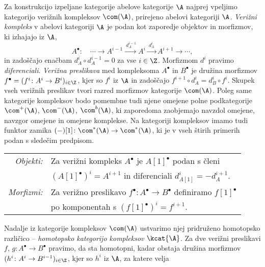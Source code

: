 Za konstrukcijo izpeljane kategorije abelove kategorije $\A$ najprej vpeljimo kategorijo verižnih kompleksov $\com(\A)$, prirejeno abelovi kategoriji $\A$.
\emph{Verižni kompleks} v abelovi kategoriji $\A$ je podan kot zaporedje objektov in morfizmov, ki izhajajo iz $\A$,
\[
    A^\bullet : \quad \cdots \to A^{i-1} \xrightarrow{\ d_A^{i-1}} A^i \xrightarrow{\ d_A^{i} \ } A^{i+1} \to \cdots,
\] 
in zadoščajo enačbam $d_A^{i} \circ d_A^{i-1} = 0$ za vse $i \in \Z$. Morfizmom $d^i$ pravimo \emph{diferenciali}. \emph{Verižna preslikava} med kompleksoma $A^\bullet$ in $B^\bullet$ je družina morfizmov $f^\bullet = (f^i \colon A^i \to B^i)_{i \in \Z}$, kjer so $f^i$ iz $\A$ in zadoščajo $f^{i+1} \circ d^i_A = d^i_B \circ f^i$. Skupek vseh verižnih preslikav tvori razred morfizmov kategorije $\com(\A)$. Poleg same kategorije kompleksov bodo pomembne tudi njene omejene polne podkategorije $\com^+(\A)$, $\com^-(\A)$, $\com^b(\A)$, ki zaporedoma zaobjemajo navzdol omejene, navzgor omejene in omejene komplekse. Na kategoriji kompleksov imamo tudi funktor zamika $(-)[1] \colon \com^*(\A) \to \com^*(\A)$, ki je v vseh štirih primerih podan s sledečim predpisom.
\begin{center}
    \begin{tabular}{r l}
        \textsl{Objekti:} & Za verižni kompleks $A^\bullet$ je $A[1]^\bullet$ podan s členi \\ & $(A[1]^\bullet)^i = A^{i+1}$ in diferenciali $d^i_{A[1]} = - d^{i+1}_{A}$. \\
        \textsl{Morfizmi:} & Za verižno preslikavo $f^\bullet\colon A^\bullet \to B^\bullet$ definiramo $f[1]^\bullet$ \\ & po komponentah s $(f[1]^\bullet)^i = f^{i+1}$.
    \end{tabular}
\end{center}
Nadalje iz kategorije kompleksov $\com(\A)$ ustvarimo njej pridruženo homotopsko različico -- \emph{homotopsko kategorijo kompleksov} $\kcat{\A}$. Za dve verižni preslikavi $f$, $g \colon A^\bullet \to B^\bullet$ pravimo, da sta homotopni, kadar obstaja družina morfizmov $(h^i \colon A^i \to B^{i-1})_{i \in\Z}$, kjer so $h^i$ iz $\A$, za katere velja
